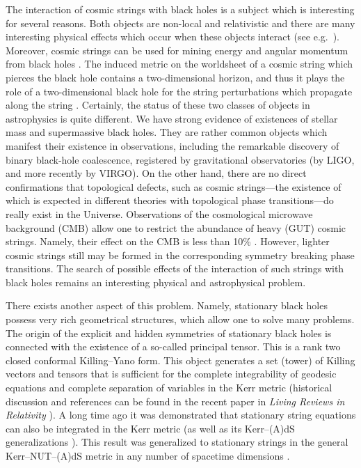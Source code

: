 \documentclass[superscriptaddress,twocolumn,showpacs,
preprintnumbers,amsmath,amssymb,nofootinbib,
longbibliography,aps,prd,10pt]{revtex4-1}
\begin{document}
The interaction of cosmic strings with black holes is a subject which is interesting for several reasons. Both objects are non-local and relativistic and there are many interesting physical effects which occur when these objects interact (see e.g.~\cite{anderson2015mathematical}). Moreover, cosmic strings can be used for mining energy and angular momentum from black holes \cite{Lawrence:1993sg,Frolov:2000kx,PhysRevD.54.5093,0264-9381-14-5-015,1402-4896-62-2-3-005,Kinoshita:2016lqd}. The induced metric on the worldsheet of a cosmic string which pierces the black hole contains a two-dimensional horizon, and thus it plays the role of a two-dimensional black hole for the string perturbations which  propagate along the string \cite{PhysRevD.54.5093}. Certainly, the status of these two classes of objects in astrophysics is quite different. We have strong evidence of existences of stellar mass and supermassive black holes. They are rather common objects which manifest their existence in observations, including the remarkable discovery of binary black-hole coalescence, registered by gravitational observatories (by LIGO, and more recently by VIRGO). On the other hand, there are no direct confirmations that topological defects, such as cosmic strings---the existence of which is expected in different theories with topological phase transitions---do really exist in the Universe. Observations of the cosmological microwave background (CMB) allow one to restrict the abundance of heavy (GUT) cosmic strings. Namely, their effect on the CMB is less than 10\% \cite{Ade:2013xla}. However, lighter cosmic strings still may be formed in the corresponding symmetry breaking phase transitions. The search of possible effects of the interaction of such strings with black holes remains an interesting physical and astrophysical problem.

There exists another aspect of this problem. Namely, stationary black holes possess very rich geometrical structures, which allow one to solve many problems. The origin of the explicit and hidden symmetries of stationary black holes is connected with the existence of a so-called principal tensor. This is a rank two closed conformal Killing--Yano form. This object generates a set (tower) of Killing vectors and tensors that is sufficient for the complete integrability of geodesic equations and complete separation of variables in the Kerr metric (historical discussion and references can be found in the recent paper in \emph{Living Reviews in Relativity} \cite{Frolov:2017kze}). A long time ago it was demonstrated that stationary string equations can also be integrated in the Kerr metric \cite{Frolov:1988zn} (as well as its Kerr--(A)dS generalizations \cite{Carter:1989bs}). This result was generalized to stationary strings in the general Kerr--NUT--(A)dS metric in any number of spacetime dimensions \cite{Kubiznak:2007ca}.
\end{document}
